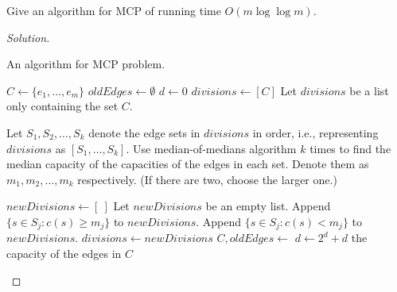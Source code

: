 



    \begin{thm}{}{}
        Give an algorithm for MCP of running time $O(m\log\log m)$.
    \end{thm}
    \begin{proof}[Solution]
        \ 
        
        \begin{algorithm}
            \caption{An algorithm for MCP problem.}
            \begin{algorithmic}
                    \State $C\gets \{e_1,\ldots,e_m\}$
                    \State $oldEdges \gets \emptyset$
                    \State $d\gets 0$
                     
                        \State $divisions\gets [C]$ \Comment Let $divisions$ be a list only containing the set $C$.
                         
                        
                            \State Let $S_1, S_2, \ldots, S_k$ denote the edge sets in $divisions$ in order, i.e., representing $divisions$ as $[S_1, \ldots, S_k]$.
                            \State Use median-of-medians algorithm $k$ times to find the median capacity of the capacities of the edges in each set. Denote them as $m_1, m_2, \ldots, m_k$ respectively. (If there are two, choose the larger one.)
                            
                            \State $newDivisions \gets [\ ]$ \Comment Let $newDivisions$ be an empty list.
                             
                            \State Append $\{s\in S_{j}:c(s) \geqslant m_{j}\}$ to $newDivisions$.
                            \State Append $\{s\in S_{j}:c(s) < m_{j}\}$ to $newDivisions$.
                            \EndFor
                            \State $divisions \gets newDivisions$
                        \EndFor
                        \State $C, oldEdges\gets$  %
                    \State $d\gets 2^{d}+d$
                    \EndWhile
                    \State \Return the capacity of the edges in $C$
                \EndFunction
                

\end{algorithmic}
\end{algorithm}
\end{proof}
